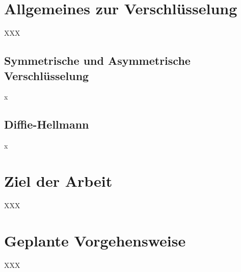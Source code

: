 \section{Allgemeines zur Verschlüsselung}
XXX

\subsection{Symmetrische und Asymmetrische Verschlüsselung}
x

\subsection{Diffie-Hellmann}
x

\section{Ziel der Arbeit}
XXX

\section{Geplante Vorgehensweise}
XXX